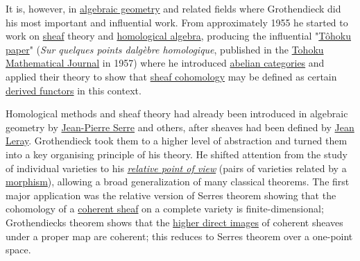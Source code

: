 It is, however, in \href{https://en.wikipedia.org/wiki/Algebraic_geometry}{algebraic geometry} and related fields where Grothendieck did his most important and influential work. From approximately 1955 he started to work on \href{https://en.wikipedia.org/wiki/Sheaf_(mathematics)}{sheaf} theory and \href{https://en.wikipedia.org/wiki/Homological_algebra}{homological algebra}, producing the influential "\href{https://en.wikipedia.org/wiki/Tôhoku_paper}{Tôhoku paper}" (\emph{Sur quelques points d\textquotesingle algèbre homologique}, published in the \href{https://en.wikipedia.org/wiki/Tohoku_Mathematical_Journal}{Tohoku Mathematical Journal} in 1957) where he introduced \href{https://en.wikipedia.org/wiki/Abelian_category}{abelian categories} and applied their theory to show that \href{https://en.wikipedia.org/wiki/Sheaf_cohomology}{sheaf cohomology} may be defined as certain \href{https://en.wikipedia.org/wiki/Derived_functor}{derived functors} in this context.

Homological methods and sheaf theory had already been introduced in algebraic geometry by \href{https://en.wikipedia.org/wiki/Jean-Pierre_Serre}{Jean-Pierre Serre} and others, after sheaves had been defined by \href{https://en.wikipedia.org/wiki/Jean_Leray}{Jean Leray}. Grothendieck took them to a higher level of abstraction and turned them into a key organising principle of his theory. He shifted attention from the study of individual varieties to his \emph{\href{https://en.wikipedia.org/wiki/Grothendieck's_relative_point_of_view}{relative point of view}} (pairs of varieties related by a \href{https://en.wikipedia.org/wiki/Morphism}{morphism}), allowing a broad generalization of many classical theorems. The first major application was the relative version of Serre\textquotesingle s theorem showing that the cohomology of a \href{https://en.wikipedia.org/wiki/Coherent_sheaf}{coherent sheaf} on a complete variety is finite-dimensional; Grothendieck\textquotesingle s theorem shows that the \href{https://en.wikipedia.org/wiki/Higher_direct_image}{higher direct images} of coherent sheaves under a proper map are coherent; this reduces to Serre\textquotesingle s theorem over a one-point space.

